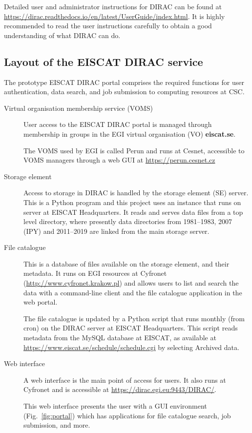 \documentclass[a4paper]{article}
\begin{document}
Detailed user and administrator instructions for DIRAC can be found at
\url{https://dirac.readthedocs.io/en/latest/UserGuide/index.html}. It
is highly recommended to read the user instructions carefully to
obtain a good understanding of what DIRAC can do.

\subsection{Layout of the EISCAT DIRAC service}
\label{sec:eiscat-dirac}

 
The prototype EISCAT DIRAC portal comprises the required functions for
user authentication, data search, and job submission to computing
resources at CSC.

\begin{description}

\item[Virtual organisation membership service (VOMS)] User access to the
  EISCAT DIRAC portal is managed through membership in groups in the
  EGI virtual organisation (VO) \textbf{eiscat.se}.  

  The VOMS used by EGI is called Perun and runs
  at Cesnet, accessible to VOMS managers through a web GUI at
  \url{https://perun.cesnet.cz}

\item[Storage element] Access to storage in DIRAC is handled by the
  storage element (SE) server. This is a Python program and this
  project uses an instance that runs on server at EISCAT
  Headquarters. It reads and serves data files from a top level
  directory, where presently data directories from 1981--1983, 2007
  (IPY) and 2011--2019 are linked from the main storage server.

\item[File catalogue] This is a database of files available on the storage element, and their metadata.  It runs on EGI resources at Cyfronet
  (\url{http://www.cyfronet.krakow.pl}) and allows users
  to list and search the data with a command-line client and the file
  catalogue application in the web portal.  

  The file catalogue is updated by a Python script that runs monthly
  (from cron) on the DIRAC server at EISCAT Headquarters. This script
  reads metadata from the MySQL database at EISCAT, as available at
  \url{https://www.eiscat.se/schedule/schedule.cgi} by selecting
  Archived data.

\item[Web interface] A web interface is the main point of access for
  users. It also runs at Cyfronet and is accessible at
  \url{https://dirac.egi.eu:9443/DIRAC/}. 

  This web interface presents the user with a GUI environment
  (Fig.~\ref{fig:portal}) which has applications for file catalogue
  search, job submission, and more.

\end{description}
\end{document}

